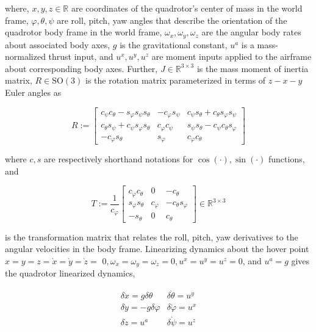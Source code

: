 \documentclass[10pt]{article}
\begin{document}
where, $x, y, z \in \mathbb{R}$ are coordinates of the quadrotor's center of mass in the world frame, $\varphi, \theta, \psi$ are roll, pitch, yaw angles that describe the orientation of the quadrotor body frame in the world frame, $\omega_{x}, \omega_{y}, \omega_{z}$ are the angular body rates about associated body axes, $g$ is the gravitational constant, $u^{a}$ is a mass-normalized thrust input, and $u^{x}, u^{y}, u^{z}$ are moment inputs applied to the airframe about corresponding body axes. Further, $J \in \mathbb{R}^{3 \times 3}$ is the mass moment of inertia matrix, $R \in \mathrm{SO}(3)$ is the rotation matrix parameterized in terms of $z-x-y$ Euler angles as

$$
R:=\left[\begin{array}{ccc}
c_{\psi} c_{\theta}-s_{\varphi} s_{\psi} s_{\theta} & -c_{\varphi} s_{\psi} & c_{\psi} s_{\theta}+c_{\theta} s_{\varphi} s_{\psi} \\
c_{\theta} s_{\psi}+c_{\psi} s_{\varphi} s_{\theta} & c_{\varphi} c_{\psi} & s_{\psi} s_{\theta}-c_{\psi} c_{\theta} s_{\varphi} \\
-c_{\varphi} s_{\theta} & s_{\varphi} & c_{\varphi} c_{\theta}
\end{array}\right]
$$

where $c, s$ are respectively shorthand notations for $\cos (\cdot), \sin (\cdot)$ functions, and

$$
T:=\frac{1}{c_{\varphi}}\left[\begin{array}{ccc}
c_{\varphi} c_{\theta} & 0 & -c_{\theta} \\
s_{\varphi} s_{\theta} & c_{\varphi} & -c_{\theta} s_{\varphi} \\
-s_{\theta} & 0 & c_{\theta}
\end{array}\right] \in \mathbb{R}^{3 \times 3}
$$

is the transformation matrix that relates the roll, pitch, yaw derivatives to the angular velocities in the body frame. Linearizing dynamics about the hover point $x=y=z=\grave{x}=\grave{y}=\grave{z}=$ $0, \omega_{x}=\omega_{y}=\omega_{z}=0, u^{x}=u^{y}=u^{z}=0$, and $u^{a}=g$ gives the quadrotor linearized dynamics,

$$
\begin{array}{ll}
\delta \grave{x}=g \delta \theta & \delta \grave{\theta}=u^{y} \\
\delta \grave{y}=-g \delta \varphi & \delta \grave{\varphi}=u^{x} \\
\delta \grave{z}=u^{a} & \delta \grave{\psi}=u^{z}
\end{array}
$$
\end{document}
